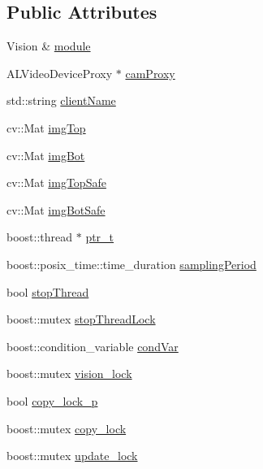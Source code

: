 \subsection*{Public Attributes}
\begin{DoxyCompactItemize}
\item 
Vision \& \hyperlink{structVision_1_1Impl_a916a09eab67eb65bf7f74b7201f7b4cc}{module}
\item 
A\-L\-Video\-Device\-Proxy $\ast$ \hyperlink{structVision_1_1Impl_a374e531e8ef64f468bcb097be04a47aa}{cam\-Proxy}
\item 
std\-::string \hyperlink{structVision_1_1Impl_a2b57273c099bd98d822ccec7e016b3bf}{client\-Name}
\item 
cv\-::\-Mat \hyperlink{structVision_1_1Impl_ada6c7b0a5be75a35c669fbd3a6fe33a6}{img\-Top}
\item 
cv\-::\-Mat \hyperlink{structVision_1_1Impl_aea3e193d00e7befebb7950e72c1d1c8d}{img\-Bot}
\item 
cv\-::\-Mat \hyperlink{structVision_1_1Impl_a31a875539cb7409ca92b7585c47f8e65}{img\-Top\-Safe}
\item 
cv\-::\-Mat \hyperlink{structVision_1_1Impl_a6e50c2bdbecb2f07247dee6da0260442}{img\-Bot\-Safe}
\item 
boost\-::thread $\ast$ \hyperlink{structVision_1_1Impl_a5ba8732b2b281582f9de34f965bfee3e}{ptr\-\_\-t}
\item 
boost\-::posix\-\_\-time\-::time\-\_\-duration \hyperlink{structVision_1_1Impl_a23cdb2b1b65eb1e85bc907b9e346cb24}{sampling\-Period}
\item 
bool \hyperlink{structVision_1_1Impl_a4828ea459158bafada673bc973c4382a}{stop\-Thread}
\item 
boost\-::mutex \hyperlink{structVision_1_1Impl_a3056fc479dd9f109a0aa8741b604ce9f}{stop\-Thread\-Lock}
\item 
boost\-::condition\-\_\-variable \hyperlink{structVision_1_1Impl_abc067b6bea87f82e9b64196663f0ba4c}{cond\-Var}
\item 
boost\-::mutex \hyperlink{structVision_1_1Impl_a33fe92eb538bb740d834b26566911872}{vision\-\_\-lock}
\item 
bool \hyperlink{structVision_1_1Impl_aa2e2dd67f138262f08432932d82e6dc9}{copy\-\_\-lock\-\_\-p}
\item 
boost\-::mutex \hyperlink{structVision_1_1Impl_a0c2807f1c2054c0a365cbb40e17e1daa}{copy\-\_\-lock}
\item 
boost\-::mutex \hyperlink{structVision_1_1Impl_a26aee8f190339f2e9c77ed782caa4b91}{update\-\_\-lock}
\item 

\end{DoxyCompactItemize}
